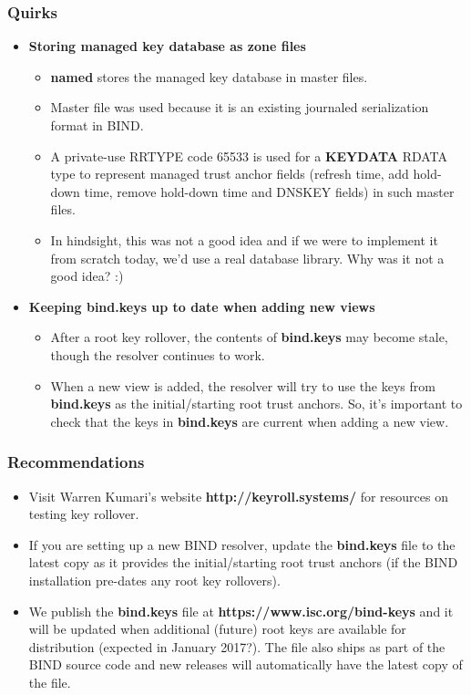 \documentclass{beamer}
\begin{document}
\frame
{
  \frametitle{Quirks}

  \begin{itemize}
  \item \textbf{Storing managed key database as zone files}
    \begin{itemize}
      \item \textbf{named} stores the managed key database in master
        files.
      \item Master file was used because it is an existing journaled
        serialization format in BIND.
      \item A private-use RRTYPE code 65533 is used for a
        \textbf{KEYDATA} RDATA type to represent managed trust anchor
        fields (refresh time, add hold-down time, remove hold-down time
        and DNSKEY fields) in such master files.
      \item In hindsight, this was not a good idea and if we were to
        implement it from scratch today, we'd use a real database
        library. Why was it not a good idea? :)
    \end{itemize}
  \item \textbf{Keeping \textbf{bind.keys} up to date when adding new views}
    \begin{itemize}
    \item After a root key rollover, the contents of \textbf{bind.keys}
      may become stale, though the resolver continues to work.
    \item When a new view is added, the resolver will try to use the
      keys from \textbf{bind.keys} as the initial/starting root trust
      anchors. So, it's important to check that the keys in
      \textbf{bind.keys} are current when adding a new view.
    \end{itemize}
  \end{itemize}
}

\frame
{
  \frametitle{Recommendations}

  \begin{itemize}
  \item Visit Warren Kumari's website \textbf{http://keyroll.systems/}
    for resources on testing key rollover.

  \item If you are setting up a new BIND resolver, update the
    \textbf{bind.keys} file to the latest copy as it provides the
    initial/starting root trust anchors (if the BIND installation
    pre-dates any root key rollovers).

  \item We publish the \textbf{bind.keys} file at
    \textbf{https://www.isc.org/bind-keys} and it will be updated when
    additional (future) root keys are available for distribution
    (expected in January 2017?). The file also ships as part of the BIND
    source code and new releases will automatically have the latest copy
    of the file.
  \end{itemize}

}
\end{document}
